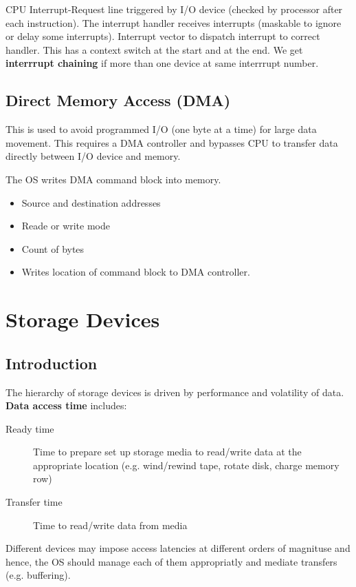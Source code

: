 \documentclass[11pt]{article}
\begin{document}
CPU Interrupt-Request line triggered by I/O device (checked by processor after each instruction).
The interrupt handler receives interrupts (maskable to ignore or delay some interrupts).
Interrupt vector to dispatch interrupt to correct handler.
This has a context switch at the start and at the end.
We get \textbf{interrrupt chaining} if more than one device at same interrrupt number.

\subsection{Direct Memory Access (DMA)}
\label{sec:org31ac013}
This is used to avoid programmed I/O (one byte at a time) for large data movement.
This requires a DMA controller and bypasses CPU to transfer data directly between I/O device and memory.

The OS writes DMA command block into memory.
\begin{itemize}
\item Source and destination addresses
\item Reade or write mode
\item Count of bytes
\item Writes location of command block to DMA controller.
\end{itemize}

\section{Storage Devices}
\label{sec:org086e042}
\subsection{Introduction}
\label{sec:orge22b44d}
The hierarchy of storage devices is driven by performance and volatility of data.
\textbf{Data access time} includes:
\begin{description}
\item[{Ready time}] Time to prepare set up storage media to read/write data at the appropriate location (e.g. wind/rewind tape, rotate disk, charge memory row)
\item[{Transfer time}] Time to read/write data from media
\end{description}
Different devices may impose access latencies at different orders of magnituse and hence, the OS should manage each of them appropriatly and mediate transfers (e.g. buffering).
\end{document}
